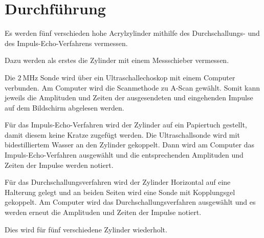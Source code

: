 \section{Durchführung}
\label{sec:Durchführung}


Es werden fünf verschieden hohe Acrylzylinder mithilfe des Durchschallungs- und des Impuls-Echo-Verfahrens vermessen.

Dazu werden als erstes die Zylinder mit einem Messschieber vermessen. 

Die $\SI{2}{\mega\hertz}$ Sonde wird über ein Ultraschallechoskop mit einem Computer verbunden.
Am Computer wird die Scanmethode zu A-Scan gewählt.
Somit kann jeweils die Amplituden und Zeiten der ausgesendeten und eingehenden Impulse auf dem Bildschirm abgelesen werden.

Für das Impuls-Echo-Verfahren wird der Zylinder auf ein Papiertuch gestellt, damit diesem keine Kratze zugefügt werden.
Die Ultraschallsonde wird mit bidestilliertem Wasser an den Zylinder gekoppelt.
Dann wird am Computer das Impuls-Echo-Verfahren ausgewählt und die entsprechenden Amplituden und Zeiten der Impulse werden notiert.

Für das Durchschallungsverfahren wird der Zylinder Horizontal auf eine Halterung gelegt und an beiden Seiten wird eine Sonde mit Kopplungsgel gekoppelt.
Am Computer wird das Durchschallungsverfahren ausgewählt und es werden erneut die Amplituden und Zeiten der Impulse notiert.

Dies wird für fünf verschiedene Zylinder wiederholt.
